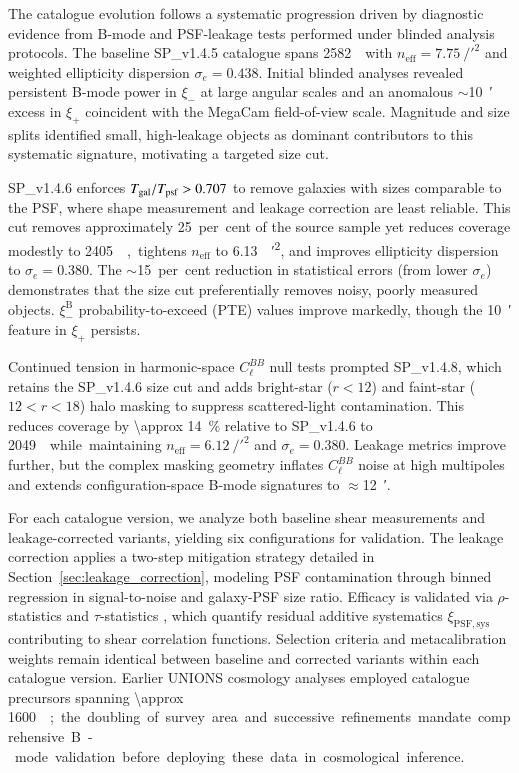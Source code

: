 \documentclass{aa}
\begin{document}
The catalogue evolution follows a systematic progression driven by diagnostic evidence from B-mode and PSF-leakage tests performed under blinded analysis protocols. The baseline SP\_v1.4.5 catalogue spans \SI{2582}{\square\deg} with $n_{\mathrm{eff}} = \SI{7.75}{\per\square\arcmin}$ and weighted ellipticity dispersion $\sigma_e = 0.438$. Initial blinded analyses revealed persistent B-mode power in $\xi_-$ at large angular scales and an anomalous $\sim$\SI{10}{\arcmin} excess in $\xi_+$ coincident with the MegaCam field-of-view scale. Magnitude and size splits identified small, high-leakage objects as dominant contributors to this systematic signature, motivating a targeted size cut.

SP\_v1.4.6 enforces $T_{\rm gal}/T_{\rm psf} > 0.707$ to remove galaxies with sizes comparable to the PSF, where shape measurement and leakage correction are least reliable. This cut removes approximately \num{25}~per~cent of the source sample yet reduces coverage modestly to \SI{2405}{\square\deg}, tightens $n_{\mathrm{eff}}$ to \SI{6.13}{\per\square\arcmin}, and improves ellipticity dispersion to $\sigma_e = 0.380$. The $\sim$\num{15}~per~cent reduction in statistical errors (from lower $\sigma_e$) demonstrates that the size cut preferentially removes noisy, poorly measured objects. $\xi_-^{\mathrm{B}}$ probability-to-exceed (PTE) values improve markedly, though the \SI{10}{\arcmin} feature in $\xi_+$ persists.

Continued tension in harmonic-space $C_\ell^{BB}$ null tests prompted SP\_v1.4.8, which retains the SP\_v1.4.6 size cut and adds bright-star ($r < 12$) and faint-star ($12 < r < 18$) halo masking to suppress scattered-light contamination. This reduces coverage by \SI{\approx 14}{\percent} relative to SP\_v1.4.6 to \SI{2049}{\square\deg} while maintaining $n_{\mathrm{eff}} = \SI{6.12}{\per\square\arcmin}$ and $\sigma_e = 0.380$. Leakage metrics improve further, but the complex masking geometry inflates $C_\ell^{BB}$ noise at high multipoles and extends configuration-space B-mode signatures to $\approx$\SI{12}{\arcmin}.

For each catalogue version, we analyze both baseline shear measurements and leakage-corrected variants, yielding six configurations for validation. The leakage correction applies a two-step mitigation strategy detailed in Section~\ref{sec:leakage_correction}, modeling PSF contamination through binned regression in signal-to-noise and galaxy-PSF size ratio. Efficacy is validated via $\rho$-statistics and $\tau$-statistics \citep{jarvis.etal16, sheldon.huff17}, which quantify residual additive systematics $\xi_{\mathrm{PSF,sys}}$ contributing to shear correlation functions. Selection criteria and metacalibration weights remain identical between baseline and corrected variants within each catalogue version. Earlier UNIONS cosmology analyses \citep{guinot.etal22, goh.etal25} employed catalogue precursors spanning \SI{\approx 1600}{\square\deg}; the doubling of survey area and successive refinements mandate comprehensive B-mode validation before deploying these data in cosmological inference.
\end{document}
